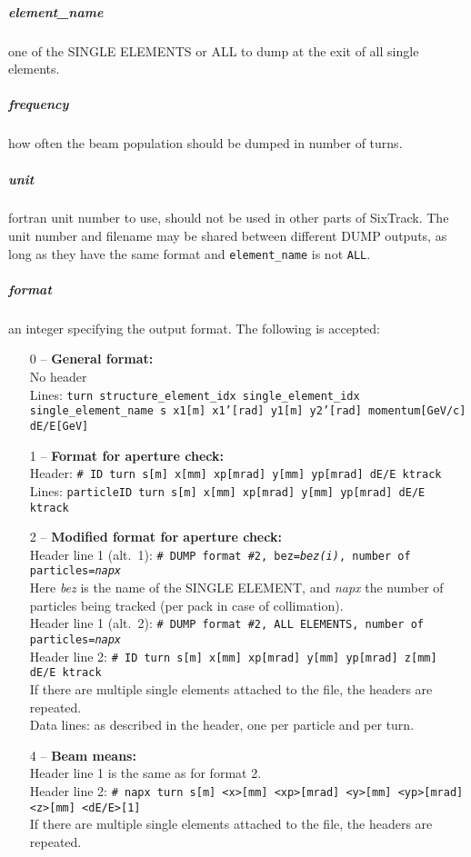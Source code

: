 \documentclass[a4paper,11pt]{report}
\begin{document}
\subparagraph{element\_name}
one of the SINGLE ELEMENTS or ALL to dump at the exit of all single elements.
\subparagraph{frequency}
how often the beam population should be dumped in number of turns.
\subparagraph{unit}
fortran unit number to use, should not be used in other parts of SixTrack.
The unit number and filename may be shared between different DUMP outputs, as long as they have the same format and \texttt{element\_name} is not \texttt{ALL}.
\subparagraph{format}
an integer specifying the output format. The following is accepted:
\begin{enumerate}
	\item[0] -- \textbf{General format:}\\
	No header\\
	Lines: \texttt{turn structure\_element\_idx single\_element\_idx single\_element\_name s x1[m] x1'[rad] y1[m] y2'[rad] momentum[GeV/c] dE/E[GeV]}
	\item[1] -- \textbf{Format for aperture check:}\\
	Header: \texttt{\# ID turn s[m] x[mm] xp[mrad] y[mm] yp[mrad] dE/E ktrack}\\
	Lines: \texttt{particleID turn s[m] x[mm] xp[mrad] y[mm] yp[mrad] dE/E ktrack}
	\item[2] -- \textbf{Modified format for aperture check:}\\
	Header line 1 (alt.\ 1): \texttt{\# DUMP format \#2, bez=\textit{bez(i)}, number of particles=\textit{napx}}\\
        Here \textit{bez} is the name of the SINGLE ELEMENT, and \textit{napx} the number of particles being tracked (per pack in case of collimation).\\
	Header line 1 (alt.\ 2): \texttt{\# DUMP format \#2, ALL ELEMENTS, number of particles=\textit{napx}}\\
	Header line 2: \texttt{\# ID turn s[m] x[mm] xp[mrad] y[mm] yp[mrad] z[mm] dE/E ktrack}\\
        If there are multiple single elements attached to the file, the headers are repeated.\\
	Data lines: as described in the header, one per particle and per turn.
	\item[4] -- \textbf{Beam means:}\\
        Header line 1 is the same as for format 2.\\
        Header line 2: \texttt{\# napx turn s[m] <x>[mm] <xp>[mrad] <y>[mm] <yp>[mrad] <z>[mm] <dE/E>[1]}\\
        If there are multiple single elements attached to the file, the headers are repeated.\\

\end{enumerate}
\end{document}
